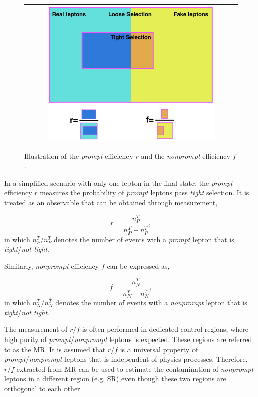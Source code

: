  \begin{figure}[tbh!]
 \begin{center}
 \begin{tabular}{c}
 \includegraphics[width=0.8\textwidth]{figures/Part3/Nonprompt/matrix}
 \end{tabular}
 \caption{Illustration of the \emph{prompt} efficiency $r$ and the \emph{nonprompt} efficiency $f$.}
 \label{fig:Matrix_Method}
 \end{center}
\end{figure}

In a simplified scenario with only one lepton in the final state, the \emph{prompt} efficiency $r$ measures the probability of \emph{prompt} leptons pass \emph{tight} selection. It is treated as an observable that can be obtained through measurement,

\begin{equation}
r=\frac{n_P^{T}}{n_P^{T}+n_P^{\overline{T}}},
 \label{eq:real_rate}
\end{equation}
in which $n_P^{T}$/$n_P^{\overline{T}}$ denotes the number of events with a \emph{prompt} lepton that is \emph{tight}/\emph{not tight}.

Similarly, \emph{nonprompt} efficiency $f$ can be expressed as,

\begin{equation}
f=\frac{n_{N}^{T}}{n_{N}^{T}+n_{N}^{\overline{T}}},
 \label{eq:fake_rate}
\end{equation}
in which $n_{N}^{T}$/$n_{N}^{\overline{T}}$ denotes the number of events with a \emph{nonprompt} lepton that is \emph{tight}/\emph{not tight}.

The measurement of $r/f$ is often performed in dedicated control regions, where high purity of \emph{prompt}/\emph{nonprompt} leptons is expected. These regions are referred to as the \ac{MR}. It is assumed that $r/f$ is a universal property of \emph{prompt}/\emph{nonprompt} leptons that is independent of physics processes. Therefore, $r/f$ extracted from \ac{MR} can be used to estimate the contamination of \emph{nonprompt} leptons in a different region (e.g. \ac{SR}) even though these two regions are orthogonal to each other.

